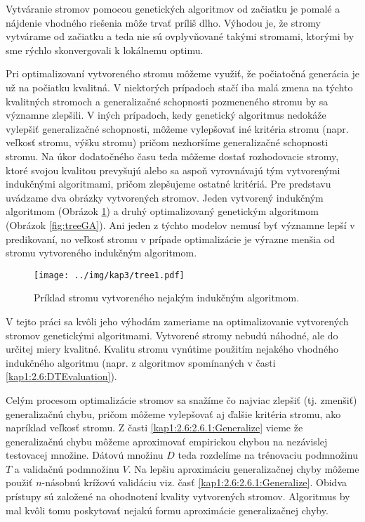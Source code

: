 Vytváranie stromov pomocou genetických algoritmov od začiatku je pomalé a nájdenie vhodného riešenia môže trvať príliš dlho. Výhodou je, že stromy vytvárame od začiatku a teda nie sú ovplyvňované takými stromami, ktorými by sme rýchlo skonvergovali k lokálnemu optimu. 

Pri optimalizovaní vytvoreného stromu môžeme využiť, že počiatočná generácia je už na počiatku kvalitná. V niektorých prípadoch stačí iba malá zmena na týchto kvalitných stromoch a generalizačné schopnosti pozmeneného stromu by sa významne zlepšili. V iných prípadoch, kedy genetický algoritmus nedokáže vylepšiť generalizačné schopnosti, môžeme vylepšovať iné kritéria stromu (napr. veľkosť stromu, výšku stromu) pričom nezhoršíme generalizačné schopnosti stromu. Na úkor dodatočného času teda môžeme dostať rozhodovacie stromy, ktoré svojou kvalitou prevyšujú alebo sa aspoň vyrovnávajú tým vytvorenými indukčnými algoritmami, pričom zlepšujeme ostatné kritériá. Pre predstavu uvádzame dva obrázky vytvorených stromov. Jeden vytvorený indukčným algoritmom (Obrázok \ref{fig:treeIA}) a druhý optimalizovaný genetickým algoritmom (Obrázok \ref{fig:treeGA}). Ani jeden z týchto modelov nemusí byť významne lepší v predikovaní, no veľkosť stromu v prípade optimalizácie je výrazne menšia od stromu vytvoreného indukčným algoritmom.

\begin{figure}[h]
\centering
\centerline{\mbox{\texttt{[image: ../img/kap3/tree1.pdf]}}}
\caption{Príklad stromu vytvoreného nejakým indukčným algoritmom.}\label{fig:treeIA}
\end{figure}

V tejto práci sa kvôli jeho výhodám zameriame na optimalizovanie vytvorených stromov genetickými algoritmami. Vytvorené stromy nebudú náhodné, ale do určitej miery kvalitné. Kvalitu stromu vynútime použitím nejakého vhodného indukčného algoritmu (napr. z algoritmov spomínaných v časti \ref{kap1:2.6:DTEvaluation}). 

Celým procesom optimalizácie stromov sa snažíme čo najviac zlepšiť (tj. zmenšiť) generalizačnú chybu, pričom môžeme vylepšovať aj ďalšie kritéria stromu, ako napríklad veľkosť stromu. Z časti \ref{kap1:2.6:2.6.1:Generalize} vieme že generalizačnú chybu môžeme aproximovať empirickou chybou na nezávislej testovacej množine. Dátovú množinu $D$ teda rozdelíme na trénovaciu podmnožinu $T$ a validačnú podmnožinu $V$. Na lepšiu aproximáciu generalizačnej chyby môžeme použiť $n$-násobnú krížovú validáciu viz. časť \ref{kap1:2.6:2.6.1:Generalize}. Obidva prístupy sú založené na ohodnotení kvality vytvorených stromov. Algoritmus by mal kvôli tomu poskytovať nejakú formu aproximácie generalizačnej chyby.

